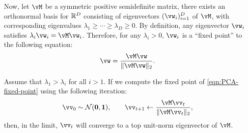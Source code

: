 \documentclass[../../book-main.tex]{subfiles}
\begin{document}
Now, let \(\vM\) be a symmetric positive semidefinite matrix, there exists an orthonormal basis for \(\mathbb{R}^{D}\) consisting of eigenvectors \((\vw_{i})_{i = 1}^{D}\) of \(\vM\), with corresponding eigenvalues \(\lambda_{1} \geq \cdots \geq \lambda_{D} \geq 0\). By definition, any eigenvector $\vw_i$ satisfies $\lambda_i \vw_i = \vM \vw_i$. Therefore, for any $\lambda_i > 0$, $\vw_i$ is a   ``fixed point'' to the following equation:
\begin{equation}
    \vw = \frac{\vM\vw}{\norm{\vM\vw}_{2}}.
    \label{eqn:PCA-fixed-point}
\end{equation}

\begin{theorem}
Assume that \(\lambda_{1} > \lambda_{i}\) for all \(i > 1\). If we compute the fixed point of  \eqref{eqn:PCA-fixed-point} using the following iteration:
\begin{equation}\label{eq:power_iteration}
    \vv_{0} \sim \dNorm(\vzero, \vone), \qquad \vv_{t + 1} \gets \frac{\vM\vv_{t}}{\norm{\vM\vv_{t}}_{2}},
\end{equation}
then, in the limit, \(\vv_{t}\) will converge to a top unit-norm eigenvector of \(\vM\).
\end{theorem}
\end{document}
